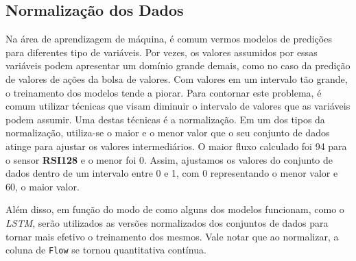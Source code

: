 \subsection{Normalização dos Dados}
Na área de aprendizagem de máquina, é comum vermos modelos de predições para diferentes tipo de variáveis. Por vezes, os valores assumidos por essas variáveis podem apresentar um domínio grande demais, como no caso da predição de valores de ações da bolsa de valores. Com valores em um intervalo tão grande, o treinamento dos modelos tende a piorar. Para contornar este problema, é comum utilizar técnicas que visam diminuir o intervalo de valores que as variáveis podem assumir. Uma destas técnicas é a normalização. Em um dos tipos da normalização, utiliza-se o maior e o menor valor que o seu conjunto de dados atinge para ajustar os valores intermediários. O maior fluxo calculado foi 94 para o sensor \textbf{RSI128} e o menor foi 0. Assim, ajustamos os valores do conjunto de dados dentro de um intervalo entre 0 e 1, com 0 representando o menor valor e 60, o maior valor. 

Além disso, em função do modo de como alguns dos modelos funcionam, como o \textit{\acrshort{LSTM}}, serão utilizados as versões normalizados dos conjuntos de dados para tornar mais efetivo o treinamento dos mesmos. Vale notar que ao normalizar, a coluna de \texttt{Flow} se tornou quantitativa contínua.

